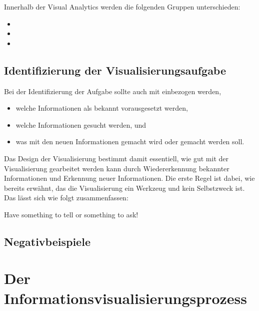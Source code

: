		Innerhalb der Visual Analytics werden die folgenden Gruppen unterschieden:
		\begin{itemize}
			\item {}
			\item {}
			\item {}
		\end{itemize}

	\section{Identifizierung der Visualisierungsaufgabe}
		Bei der Identifizierung der Aufgabe sollte auch mit einbezogen werden,
		\begin{itemize}
			\item welche Informationen als bekannt vorausgesetzt werden,
			\item welche Informationen gesucht werden, und
			\item was mit den neuen Informationen gemacht wird oder gemacht werden soll.
		\end{itemize}
		Das Design der Visualisierung bestimmt damit essentiell, wie gut mit der Visualisierung gearbeitet werden kann durch Wiedererkennung bekannter Informationen und Erkennung neuer Informationen. Die erste Regel ist dabei, wie bereits erwähnt, das die Visualisierung ein Werkzeug und kein Selbstzweck ist. Das lässt sich wie folgt zusammenfassen:
		\begin{center}
			Have something to tell or something to ask!
		\end{center}

	\section{Negativbeispiele} %

\chapter{Der Informationsvisualisierungsprozess}
\label{c:visualisierungsprozess}

